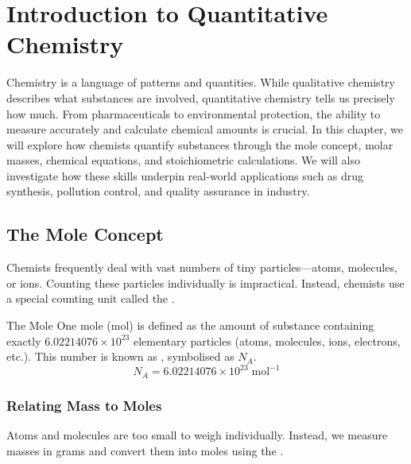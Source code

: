 \chapter{Introduction to Quantitative Chemistry}

Chemistry is a language of patterns and quantities. While qualitative chemistry describes what substances are involved, quantitative chemistry tells us precisely how much. From pharmaceuticals to environmental protection, the ability to measure accurately and calculate chemical amounts is crucial. In this chapter, we will explore how chemists quantify substances through the mole concept, molar masses, chemical equations, and stoichiometric calculations. We will also investigate how these skills underpin real-world applications such as drug synthesis, pollution control, and quality assurance in industry.

\section{The Mole Concept}
\FloatBarrier
\FloatBarrier
\FloatBarrier
{}

Chemists frequently deal with vast numbers of tiny particles—atoms, molecules, or ions. Counting these particles individually is impractical. Instead, chemists use a special counting unit called the .

\begin{keyconcept}{The Mole}
One mole (\si{\mol}) is defined as the amount of substance containing exactly \(6.02214076 \times 10^{23}\) elementary particles (atoms, molecules, ions, electrons, etc.). This number is known as , symbolised as \(N_A\).
\[
N_A = 6.02214076 \times 10^{23}\;\text{mol}^{-1}
\]
\end{keyconcept}


\subsection{Relating Mass to Moles}
\FloatBarrier
\FloatBarrier
\FloatBarrier

Atoms and molecules are too small to weigh individually. Instead, we measure masses in grams and convert them into moles using the .

